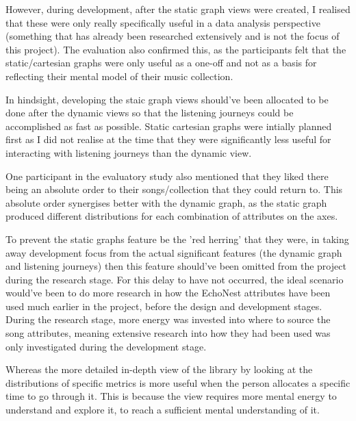 However, during development, after the static graph views were created, I realised that these were only really specifically useful in a data analysis perspective (something that has already been researched extensively and is not the focus of this project). The evaluation also confirmed this, as the participants felt that the static/cartesian graphs were only useful as a one-off and not as a basis for reflecting their mental model of their music collection.

In hindsight, developing the staic graph views should've been allocated to be done after the dynamic views so that the listening journeys could be accomplished as fast as possible. Static cartesian graphs were intially planned first as I did not realise at the time that they were significantly less useful for interacting with listening journeys than the dynamic view.

One participant in the evaluatory study also mentioned that they liked there being an absolute order to their songs/collection that they could return to. This absolute order synergises better with the dynamic graph, as the static graph produced different distributions for each combination of attributes on the axes.

To prevent the static graphs feature be the 'red herring' that they were, in taking away development focus from the actual significant features (the dynamic graph and listening journeys) then this feature should've been omitted from the project during the research stage.
For this delay to have not occurred, the ideal scenario would've been to do more research in how the EchoNest attributes have been used much earlier in the project, before the design and development stages. 
During the research stage, more energy was invested into where to source the song attributes, meaning extensive research into how they had been used was only investigated during the development stage.



Whereas the more detailed in-depth view of the library by looking at the distributions of specific metrics is more useful when the person allocates a specific time to go through it.
This is because the view requires more mental energy to understand and explore it, to reach a sufficient mental understanding of it.

